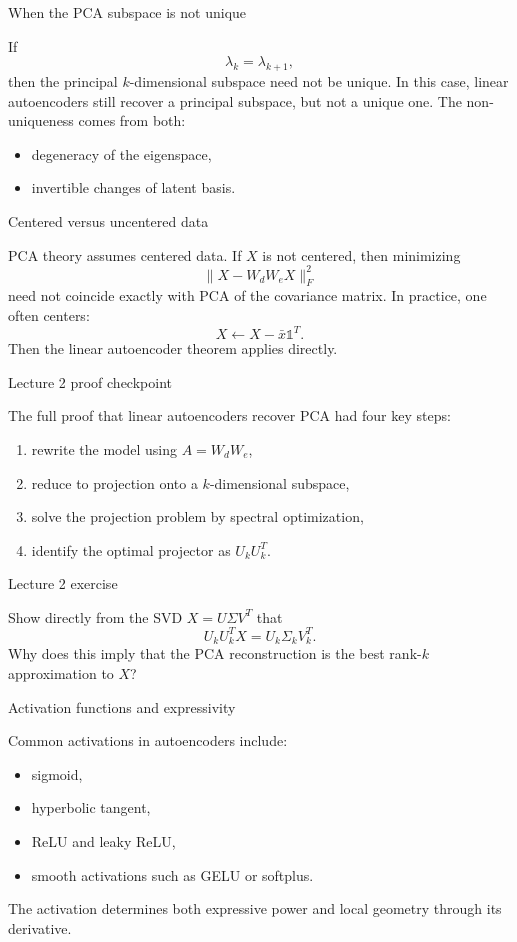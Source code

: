 \documentclass[aspectratio=169]{beamer}
\begin{document}
\begin{frame}{When the PCA subspace is not unique}

If
\[
\lambda_k = \lambda_{k+1},
\]
then the principal \(k\)-dimensional subspace need not be unique.
In this case, linear autoencoders still recover a principal subspace, but not a unique one.
The non-uniqueness comes from both:
\begin{itemize}
\item degeneracy of the eigenspace,
\item invertible changes of latent basis.
\end{itemize}

\end{frame}

\begin{frame}{Centered versus uncentered data}

PCA theory assumes centered data. If \(X\) is not centered, then minimizing
\[
\|X-W_dW_eX\|_F^2
\]
need not coincide exactly with PCA of the covariance matrix.
In practice, one often centers:
\[
X \leftarrow X - \bar x \mathds{1}^T.
\]
Then the linear autoencoder theorem applies directly.

\end{frame}

\begin{frame}{Lecture 2 proof checkpoint}

The full proof that linear autoencoders recover PCA had four key steps:
\begin{enumerate}
\item rewrite the model using \(A=W_dW_e\),
\item reduce to projection onto a \(k\)-dimensional subspace,
\item solve the projection problem by spectral optimization,
\item identify the optimal projector as \(U_kU_k^T\).
\end{enumerate}

\end{frame}

\begin{frame}{Lecture 2 exercise}

Show directly from the SVD \(X=U\Sigma V^T\) that
\[
U_kU_k^TX = U_k\Sigma_k V_k^T.
\]
Why does this imply that the PCA reconstruction is the best rank-\(k\) approximation to \(X\)?

\end{frame}

\begin{frame}{Activation functions and expressivity}

Common activations in autoencoders include:
\begin{itemize}
\item sigmoid,
\item hyperbolic tangent,
\item ReLU and leaky ReLU,
\item smooth activations such as GELU or softplus.
\end{itemize}
The activation determines both expressive power and local geometry through its derivative.

\end{frame}
\end{document}
